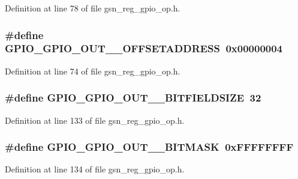 Definition at line 78 of file gsn\_\-reg\_\-gpio\_\-op.h.

\hypertarget{a00553_ada0ad17a3107a4db928652912ad0aa25}{
\subsubsection[{GPIO\_\-GPIO\_\-OUT\_\-0\_\-OFFSETADDRESS}]{\setlength{\rightskip}{0pt plus 5cm}\#define GPIO\_\-GPIO\_\-OUT\_\_\-OFFSETADDRESS~0x00000004}}
\label{a00553_ada0ad17a3107a4db928652912ad0aa25}


Definition at line 74 of file gsn\_\-reg\_\-gpio\_\-op.h.

\hypertarget{a00553_acb6b2705df01b08823554a9db0908fc7}{
\subsubsection[{GPIO\_\-GPIO\_\-OUT\_\-1\_\-BITFIELDSIZE}]{\setlength{\rightskip}{0pt plus 5cm}\#define GPIO\_\-GPIO\_\-OUT\_\_\-BITFIELDSIZE~32}}
\label{a00553_acb6b2705df01b08823554a9db0908fc7}


Definition at line 133 of file gsn\_\-reg\_\-gpio\_\-op.h.

\hypertarget{a00553_a0539ed97663adaafa9a659b895676bc5}{
\subsubsection[{GPIO\_\-GPIO\_\-OUT\_\-1\_\-BITMASK}]{\setlength{\rightskip}{0pt plus 5cm}\#define GPIO\_\-GPIO\_\-OUT\_\_\-BITMASK~0xFFFFFFFF}}
\label{a00553_a0539ed97663adaafa9a659b895676bc5}


Definition at line 134 of file gsn\_\-reg\_\-gpio\_\-op.h.

